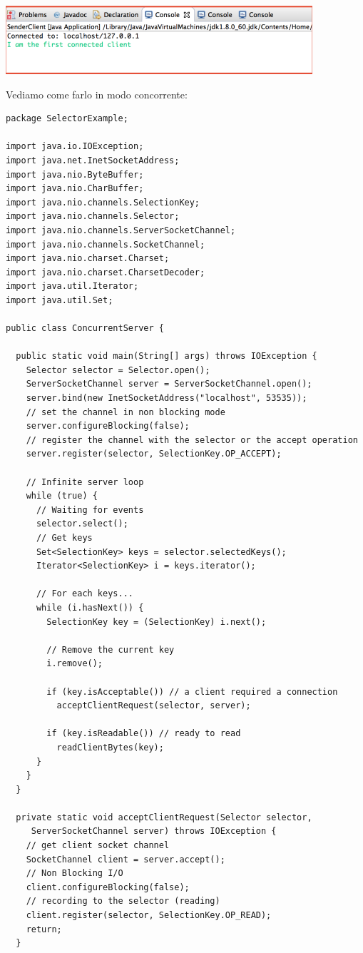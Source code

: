\documentclass[a4paper,12pt, oneside]{book}
\begin{document}
\begin{center}
	\includegraphics[scale=0.7]{img/conc4.png}
\end{center}
Vediamo come farlo in modo concorrente:
\begin{verbatim}
package SelectorExample;

import java.io.IOException;
import java.net.InetSocketAddress;
import java.nio.ByteBuffer;
import java.nio.CharBuffer;
import java.nio.channels.SelectionKey;
import java.nio.channels.Selector;
import java.nio.channels.ServerSocketChannel;
import java.nio.channels.SocketChannel;
import java.nio.charset.Charset;
import java.nio.charset.CharsetDecoder;
import java.util.Iterator;
import java.util.Set;

public class ConcurrentServer {

  public static void main(String[] args) throws IOException {
    Selector selector = Selector.open();
    ServerSocketChannel server = ServerSocketChannel.open();
    server.bind(new InetSocketAddress("localhost", 53535));
    // set the channel in non blocking mode
    server.configureBlocking(false);
    // register the channel with the selector or the accept operation
    server.register(selector, SelectionKey.OP_ACCEPT);

    // Infinite server loop
    while (true) {
      // Waiting for events
      selector.select();
      // Get keys
      Set<SelectionKey> keys = selector.selectedKeys();
      Iterator<SelectionKey> i = keys.iterator();

      // For each keys...
      while (i.hasNext()) {
        SelectionKey key = (SelectionKey) i.next();

        // Remove the current key
        i.remove();

        if (key.isAcceptable()) // a client required a connection
          acceptClientRequest(selector, server);

        if (key.isReadable()) // ready to read
          readClientBytes(key);
      }
    }
  }

  private static void acceptClientRequest(Selector selector,
     ServerSocketChannel server) throws IOException {
    // get client socket channel
    SocketChannel client = server.accept();
    // Non Blocking I/O
    client.configureBlocking(false);
    // recording to the selector (reading)
    client.register(selector, SelectionKey.OP_READ);
    return;
  }


\end{verbatim}
\end{document}
